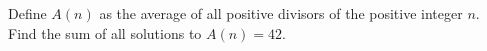Define $A(n)$ as the average of all positive divisors of the positive integer $n$. Find the sum of all solutions to $A(n)=42$.
